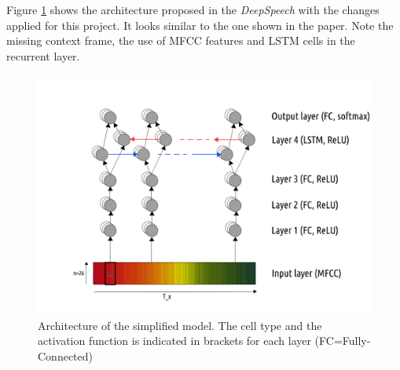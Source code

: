 Figure \ref{model_architecture} shows the architecture proposed in the \textit{DeepSpeech} with the changes applied for this project. It looks similar to the one shown in the paper. Note the missing context frame, the use of \ac{MFCC} features and \ac{LSTM} cells in the recurrent layer.

\begin{figure}[h!]
	\includegraphics[width=\linewidth]{./img/model_architecture.png}
	\caption{Architecture of the simplified model. The cell type and the activation function is indicated in brackets for each layer (FC=Fully-Connected)}
	\label{model_architecture}
\end{figure}